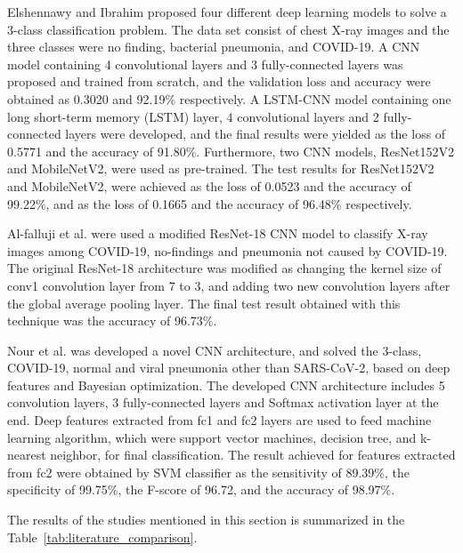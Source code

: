 Elshennawy and Ibrahim \cite{literature_elshennawy} proposed four different deep learning models to solve a 3-class classification problem. The data set consist of chest X-ray images and the three classes were no finding, bacterial pneumonia, and COVID-19. A CNN model containing 4 convolutional layers and 3 fully-connected layers was proposed and trained from scratch, and the validation loss and accuracy were obtained as 0.3020 and 92.19\% respectively. A LSTM-CNN model containing one long short-term memory (LSTM) layer, 4 convolutional layers and 2 fully-connected layers were developed, and the final results were yielded as the loss of 0.5771 and the accuracy of 91.80\%. Furthermore, two CNN models, ResNet152V2 and MobileNetV2, were used as pre-trained. The test results for ResNet152V2 and MobileNetV2, were achieved as the loss of 0.0523 and the accuracy of 99.22\%, and as the loss of 0.1665 and the accuracy of 96.48\% respectively.

Al-falluji et al. \cite{literature_Al-Falluji} were used a modified ResNet-18 CNN model to classify X-ray images among COVID-19, no-findings and pneumonia not caused by COVID-19. The original ResNet-18 architecture was modified as changing the kernel size of conv1 convolution layer from 7 to 3, and adding two new convolution layers after the global average pooling layer. The final test result obtained with this technique was the accuracy of 96.73\%.

Nour et al. \cite{A_novelCNNModel} was developed a novel CNN architecture, and solved the 3-class, COVID-19, normal and viral pneumonia other than SARS-CoV-2, based on deep features and Bayesian optimization. The developed CNN architecture includes 5 convolution layers, 3 fully-connected layers and Softmax activation layer at the end. Deep features extracted from fc1 and fc2 layers are used to feed machine learning algorithm, which were support vector machines, decision tree, and k-nearest neighbor, for final classification. The result achieved for features extracted from fc2 were obtained by SVM classifier as the sensitivity of 89.39\%, the specificity of 99.75\%, the F-score of 96.72, and the accuracy of 98.97\%.

The results of the studies mentioned in this section is summarized in the Table~\ref{tab:literature_comparison}.

